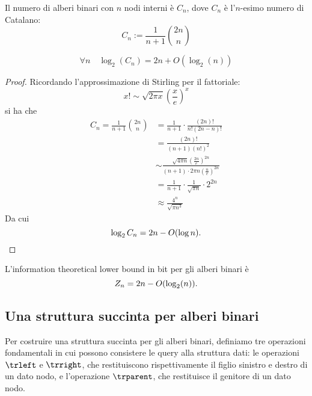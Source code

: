 \begin{theorem}
	Il numero di alberi binari con $n$ nodi interni è $C_n$, dove $C_n$ è l'$n$-esimo numero di Catalano:
	\begin{equation*}
		C_n := \frac{1}{n+1}\binom{2n}{n}
	\end{equation*}
\end{theorem}
\begin{corollario}
	\begin{equation*}
		\forall n \quad\log_2(C_n)=2n+O(\log_2(n))
	\end{equation*}
\end{corollario}
\begin{proof}
	Ricordando l'approssimazione di Stirling per il fattoriale:
	\begin{equation*}
		x! \sim \sqrt{2\pi x} \left(\frac{x}{e}\right)^x
	\end{equation*}
	si ha che
	\begin{align*}
		C_n = \frac{1}{n+1}\binom{2n}{n} & = \frac{1}{n+1}\cdot\frac{(2n)!}{n!(2n-n)!}                                                             \\
		                                 & = \frac{(2n)!}{(n+1)(n!)^2}                                                                             \\
		                                 & \sim \frac{\sqrt{4\pi n}\left(\frac{2n}{e}\right)^{2n}}{(n+1)\cdot 2\pi n\left(\frac{n}{e}\right)^{2n}} \\
		                                 & = \frac{1}{n+1}\cdot \frac{1}{\sqrt{\pi n}}\cdot 2^{2n}                                                 \\
		                                 & \approx \frac{4^n}{\sqrt{\pi n^3}}
	\end{align*}
	Da cui
	\begin{equation*}
		\log_2 C_n = 2n-O(\log n) \text.
	\end{equation*}
\end{proof}
\begin{corollario}\label{corol:bitree:itlb}
	L'information theoretical lower bound in bit per gli alberi binari è
	\begin{equation*}
		Z_n = 2n-O(\log_2(n)) \text.
	\end{equation*}
\end{corollario}


\subsection{Una struttura succinta per alberi binari}
Per costruire una struttura succinta per gli alberi binari, definiamo tre operazioni fondamentali in cui possono consistere le query alla struttura dati: le operazioni $\trleft$ e $\trright$, che restituiscono rispettivamente il figlio sinistro e destro di un dato nodo, e l'operazione $\trparent$, che restituisce il genitore di un dato nodo.

